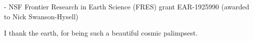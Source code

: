 \documentclass{ucbthesis}
\begin{document}
\begin{frontmatter}
\begin{acknowledgements}
    \hspace{\parindent} - NSF Frontier Research in Earth Science (FRES) grant EAR-1925990 (awarded to Nick Swanson-Hysell)
    \vspace{5mm}
    
I thank the earth, for being such a beautiful cosmic palimpsest. 

\end{acknowledgements}

\end{frontmatter}

\pagestyle{headings}












\appendix




\end{document}
